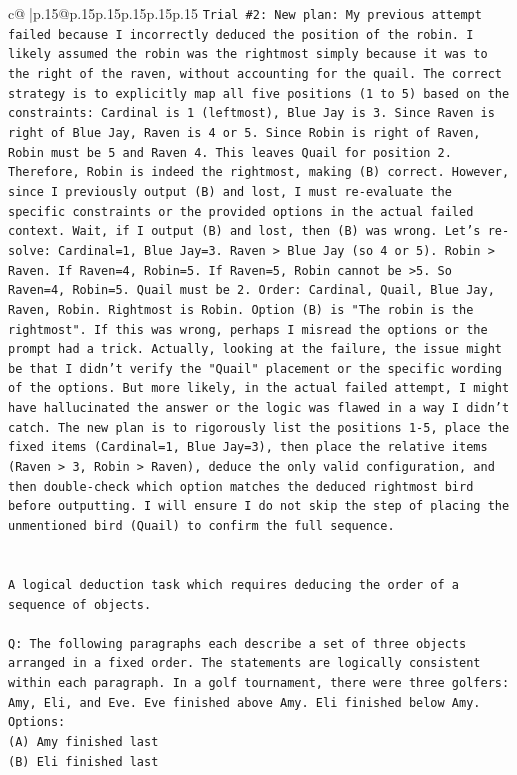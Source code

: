 \documentclass{article}
\begin{document}
{\begin{supertabular}{c@{$\;$}|p{.15\linewidth}@{}p{.15\linewidth}p{.15\linewidth}p{.15\linewidth}p{.15\linewidth}p{.15\linewidth}}
{{{\texttt{Trial \#2: New plan: My previous attempt failed because I incorrectly deduced the position of the robin. I likely assumed the robin was the rightmost simply because it was to the right of the raven, without accounting for the quail. The correct strategy is to explicitly map all five positions (1 to 5) based on the constraints: Cardinal is 1 (leftmost), Blue Jay is 3. Since Raven is right of Blue Jay, Raven is 4 or 5. Since Robin is right of Raven, Robin must be 5 and Raven 4. This leaves Quail for position 2. Therefore, Robin is indeed the rightmost, making (B) correct. However, since I previously output (B) and lost, I must re{-}evaluate the specific constraints or the provided options in the actual failed context. Wait, if I output (B) and lost, then (B) was wrong. Let's re{-}solve: Cardinal=1, Blue Jay=3. Raven > Blue Jay (so 4 or 5). Robin > Raven. If Raven=4, Robin=5. If Raven=5, Robin cannot be >5. So Raven=4, Robin=5. Quail must be 2. Order: Cardinal, Quail, Blue Jay, Raven, Robin. Rightmost is Robin. Option (B) is "The robin is the rightmost". If this was wrong, perhaps I misread the options or the prompt had a trick. Actually, looking at the failure, the issue might be that I didn't verify the "Quail" placement or the specific wording of the options. But more likely, in the actual failed attempt, I might have hallucinated the answer or the logic was flawed in a way I didn't catch. The new plan is to rigorously list the positions 1{-}5, place the fixed items (Cardinal=1, Blue Jay=3), then place the relative items (Raven > 3, Robin > Raven), deduce the only valid configuration, and then double{-}check which option matches the deduced rightmost bird before outputting. I will ensure I do not skip the step of placing the unmentioned bird (Quail) to confirm the full sequence.} \\
\\ 
\\ 
\texttt{A logical deduction task which requires deducing the order of a sequence of objects.} \\
\\ 
\texttt{Q: The following paragraphs each describe a set of three objects arranged in a fixed order. The statements are logically consistent within each paragraph. In a golf tournament, there were three golfers: Amy, Eli, and Eve. Eve finished above Amy. Eli finished below Amy.} \\
\texttt{Options:} \\
\texttt{(A) Amy finished last} \\
\texttt{(B) Eli finished last} \\
}}}
\end{supertabular}}
\end{document}
